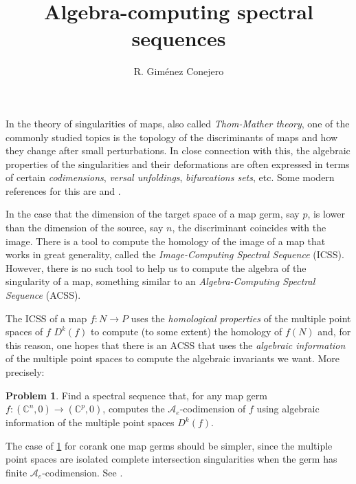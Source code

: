 \documentclass[a4paper,11pt]{amsart}
\theoremstyle{plain}
\theoremstyle{definition}
\newtheorem{problem}[theorem]{Problem}
\begin{document}
\author{R. Giménez Conejero}
\title{Algebra-computing spectral sequences}


\maketitle


In the theory of singularities of maps, also called \textsl{Thom-Mather theory}, one of the commonly studied topics is the topology of the discriminants of maps and how they change after small perturbations. In close connection with this, the algebraic properties of the singularities and their deformations are often expressed in terms of certain \textsl{codimensions}, \textsl{versal unfoldings}, \textsl{bifurcations sets}, etc. Some modern references for this are \cite{Mond2020} and \cite[Chapter 2]{HB3}.

In the case that the dimension of the target space of a map germ, say $p$, is lower than the dimension of the source, say $n$, the discriminant coincides with the image. There is a tool to compute the homology of the image of a map that works in great generality, called the \textit{Image-Computing Spectral Sequence} (ICSS). However, there is no such tool to help us to compute the algebra of the singularity of a map, something similar to an \textsl{Algebra-Computing Spectral Sequence} (ACSS).

The ICSS of a map $f:N\rightarrow P$ uses the \textsl{homological properties} of the multiple point spaces of $f$ $D^k(f)$ to compute (to some extent) the homology of $f(N)$ and, for this reason, one hopes that there is an ACSS that uses the \textsl{algebraic information} of the multiple point spaces to compute the algebraic invariants we want. More precisely:

\begin{problem}\label{prob:ACSS}
Find a spectral sequence that, for any map germ $f:(\mathbb{C}^n,0)\rightarrow(\mathbb{C}^p,0)$, computes the $\mathscr{A}_e$-codimension of $f$ using algebraic information of the multiple point spaces $D^k(f)$.
\end{problem}

The case of \cref{prob:ACSS} for corank one map germs should be simpler, since the multiple point spaces are isolated complete intersection singularities when the germ has finite $\mathscr{A}_e$-codimension. See \cite[Proposition 2.14]{Marar1989}.
\end{document}
